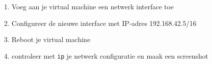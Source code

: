 \begin{enumerate}
\item Voeg aan je virtual machine een netwerk interface toe
\item Configureer de nieuwe interface met IP-adres 192.168.42.5/16
\item Reboot je virtual machine
\item controleer met \texttt{ip} je netwerk configuratie en maak een screenshot
\end{enumerate}


